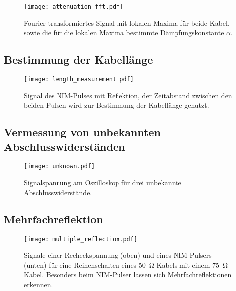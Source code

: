 \begin{figure}
  \centering
  \texttt{[image: attenuation\_fft.pdf]}
  \caption{%
    Fourier-transformiertes Signal mit lokalen Maxima für beide Kabel, sowie die für die lokalen Maxima bestimmte Dämpfungskonstante $α$.
  }\label{fig:attenuation_fft}
\end{figure}

\subsection{Bestimmung der Kabellänge}

\begin{figure}
  \centering
  \texttt{[image: length\_measurement.pdf]}
  \caption{%
    Signal des NIM-Pulses mit Reflektion, der Zeitabstand zwischen den beiden Pulsen wird zur Bestimmung der Kabellänge genutzt.
  }\label{fig:length}
\end{figure}

\subsection{Vermessung von unbekannten Abschlusswiderständen}

\begin{figure}
  \centering
  \texttt{[image: unknown.pdf]}
  \caption{%
    Signalspannung am Oszilloskop für drei unbekannte Abschlusswiderstände.
  }\label{fig:unknown}
\end{figure}

\subsection{Mehrfachreflektion}

\begin{figure}
  \centering
  \texttt{[image: multiple\_reflection.pdf]}
  \caption{%
    Signale einer Recheckspannung (oben) und eines NIM-Pulsers (unten) für eine Reihenschalten eines \SI{50}{\ohm}-Kabels mit einem \SI{75}{\ohm}-Kabel.
    Besonders beim NIM-Pulser lassen sich Mehrfachreflektionen erkennen.
  }\label{fig:multiple_reflection}
\end{figure}
